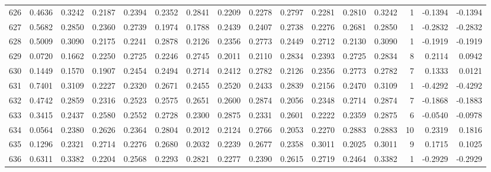 \begin{tabular}{lrrrrrrrrrrrrrrr}
626 &      0.4636 &  0.3242 &  0.2187 &  0.2394 &  0.2352 &  0.2841 &  0.2209 &  0.2278 &  0.2797 &  0.2281 &   0.2810 &     0.3242 &      1 &                   -0.1394 &                    -0.1394 \\
627 &      0.5682 &  0.2850 &  0.2360 &  0.2739 &  0.1974 &  0.1788 &  0.2439 &  0.2407 &  0.2738 &  0.2276 &   0.2681 &     0.2850 &      1 &                   -0.2832 &                    -0.2832 \\
628 &      0.5009 &  0.3090 &  0.2175 &  0.2241 &  0.2878 &  0.2126 &  0.2356 &  0.2773 &  0.2449 &  0.2712 &   0.2130 &     0.3090 &      1 &                   -0.1919 &                    -0.1919 \\
629 &      0.0720 &  0.1662 &  0.2250 &  0.2725 &  0.2246 &  0.2745 &  0.2011 &  0.2110 &  0.2834 &  0.2393 &   0.2725 &     0.2834 &      8 &                    0.2114 &                     0.0942 \\
630 &      0.1449 &  0.1570 &  0.1907 &  0.2454 &  0.2494 &  0.2714 &  0.2412 &  0.2782 &  0.2126 &  0.2356 &   0.2773 &     0.2782 &      7 &                    0.1333 &                     0.0121 \\
631 &      0.7401 &  0.3109 &  0.2227 &  0.2320 &  0.2671 &  0.2455 &  0.2520 &  0.2433 &  0.2839 &  0.2156 &   0.2470 &     0.3109 &      1 &                   -0.4292 &                    -0.4292 \\
632 &      0.4742 &  0.2859 &  0.2316 &  0.2523 &  0.2575 &  0.2651 &  0.2600 &  0.2874 &  0.2056 &  0.2348 &   0.2714 &     0.2874 &      7 &                   -0.1868 &                    -0.1883 \\
633 &      0.3415 &  0.2437 &  0.2580 &  0.2552 &  0.2728 &  0.2300 &  0.2875 &  0.2331 &  0.2601 &  0.2222 &   0.2359 &     0.2875 &      6 &                   -0.0540 &                    -0.0978 \\
634 &      0.0564 &  0.2380 &  0.2626 &  0.2364 &  0.2804 &  0.2012 &  0.2124 &  0.2766 &  0.2053 &  0.2270 &   0.2883 &     0.2883 &     10 &                    0.2319 &                     0.1816 \\
635 &      0.1296 &  0.2321 &  0.2714 &  0.2276 &  0.2680 &  0.2032 &  0.2239 &  0.2677 &  0.2358 &  0.3011 &   0.2025 &     0.3011 &      9 &                    0.1715 &                     0.1025 \\
636 &      0.6311 &  0.3382 &  0.2204 &  0.2568 &  0.2293 &  0.2821 &  0.2277 &  0.2390 &  0.2615 &  0.2719 &   0.2464 &     0.3382 &      1 &                   -0.2929 &                    -0.2929 \\

\end{tabular}
